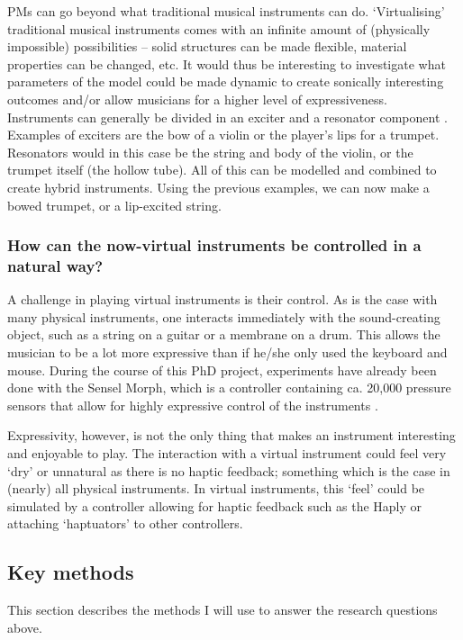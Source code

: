 \noindent PMs can go beyond what traditional musical instruments can do. ‘Virtualising’ traditional musical instruments comes with an infinite amount of (physically impossible) possibilities -- solid structures can be made flexible, material properties can be changed, etc. It would thus be interesting to investigate what parameters of the model could be made dynamic to create sonically interesting outcomes and/or allow musicians for a higher level of expressiveness.
\\

\noindent Instruments can generally be divided in an exciter and a resonator component \cite{Borin1989}. Examples of exciters are the bow of a violin or the player's lips for a trumpet. Resonators would in this case be the string and body of the violin, or the trumpet itself (the hollow tube). All of this can be modelled and combined to create hybrid instruments. Using the previous examples, we can now make a bowed trumpet, or a lip-excited string.

\subsubsection*{How can the now-virtual instruments be controlled in a natural way?}
A challenge in playing virtual instruments is their control. As is the case with many physical instruments, one interacts immediately with the sound-creating object, such as a string on a guitar or a membrane on a drum. This allows the musician to be a lot more expressive than if he/she only used the keyboard and mouse. During the course of this PhD project, experiments have already been done with the Sensel Morph, which is a controller containing ca. 20,000 pressure sensors that allow for highly expressive control of the instruments \cite{Sensel2019}.

Expressivity, however, is not the only thing that makes an instrument interesting and enjoyable to play. The interaction with a virtual instrument could feel very `dry' or unnatural as there is no haptic feedback; something which is the case in (nearly) all physical instruments. In virtual instruments, this `feel' could be simulated by a controller allowing for haptic feedback such as the Haply \cite{Haply2019} or attaching `haptuators' \cite{tactile2019} to other controllers.

\subsection{Key methods}
This section describes the methods I will use to answer the research questions above.

